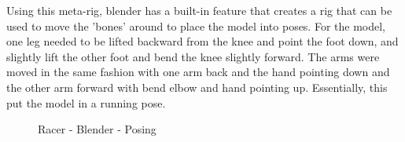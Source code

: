 \documentclass[a4 paper, 12pt]{article}
\begin{document}
Using this meta-rig, blender has a built-in feature that creates a rig that can be used to move the 'bones' around to place the model into poses. For the model, one leg needed to be lifted backward from the knee and point the foot down, and slightly lift the other foot and bend the knee slightly forward. The arms were moved in the same fashion with one arm back and the hand pointing down and the other arm forward with bend elbow and hand pointing up. Essentially, this put the model in a running pose.
    \begin{figure} [H]
        \caption{Racer - Blender - Posing}   
    \end{figure}
\end{document}
